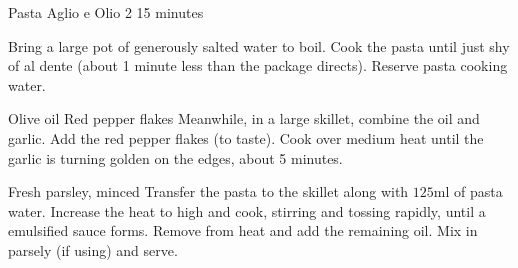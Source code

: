 \begin{recipe}
    {Pasta Aglio e Olio}
    {2}
    {15 minutes}
    
    Bring a large pot of generously salted water to boil.
    Cook the pasta until just shy of al dente
    (about 1 minute less than the package directs).
    Reserve pasta cooking water.
    
      {Olive oil}
    \ing[] {}      {Red pepper flakes}
    Meanwhile, in a large skillet, combine the oil and garlic.
    Add the red pepper flakes (to taste).
    Cook over medium heat until the garlic is turning golden on the edges,
    about 5 minutes.

    \ing[] {}    {Fresh parsley, minced}
    Transfer the pasta to the skillet along with $125$ml of pasta water.
    Increase the heat to high and cook, stirring and tossing rapidly,
    until a emulsified sauce forms.
    Remove from heat and add the remaining oil.
    Mix in parsely (if using) and serve.
\end{recipe}
